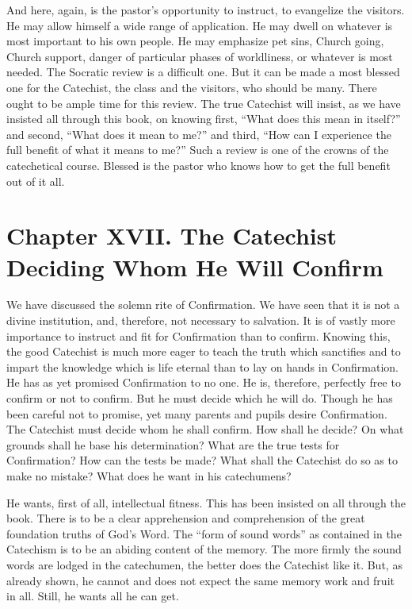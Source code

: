  And here, again, is the pastor’s opportunity to instruct, to evangelize the visitors. He may allow himself a wide range of application. He may dwell on whatever is most important to his own people. He may emphasize pet sins, Church going, Church support, danger of particular phases of worldliness, or whatever is most needed. The Socratic review is a difficult one. But it can be made a most blessed one for the Catechist, the class and the visitors, who should be many. There ought to be ample time for this review. The true Catechist will insist, as we have insisted all through this book, on knowing first, “What does this mean in itself?” and second, “What does it mean to me?” and third, “How can I
experience the full benefit of what it means to me?” Such a review is one of the crowns of the catechetical course. Blessed is the pastor who knows how to get the full benefit out of it all.

\chapter[Chapter XVII. Whom He Will Confirm]{Chapter XVII. The Catechist Deciding Whom He Will Confirm}

 We have discussed the solemn rite of Confirmation. We have seen that it is not a divine institution, and, therefore, not necessary to salvation. It is of vastly more importance to instruct and fit for Confirmation than to confirm. Knowing this, the good Catechist is much more eager to teach the truth which sanctifies and to impart the knowledge which is life eternal than to lay on hands in Confirmation. He has as yet promised Confirmation to no one. He is, therefore, perfectly free to confirm or not to confirm. But he must decide which he will do. Though he has been careful not to promise, yet many parents and pupils desire Confirmation. The Catechist must decide whom he shall confirm. How shall he decide? On what grounds shall he base his determination? What are the true tests for Confirmation? How can the tests be made? What shall the Catechist do so as to make no mistake? What does he want in his catechumens?

He wants, first of all, intellectual fitness. This has been insisted on all through the book. There is to be a clear apprehension and comprehension of
the great foundation truths of God’s Word. The “form of sound words” as contained in the Catechism is to be an abiding content of the memory. The more firmly the sound words are lodged in the catechumen, the better does the Catechist like it. But, as already shown, he cannot and does not expect the same memory work and fruit in all. Still, he wants all he can get.

